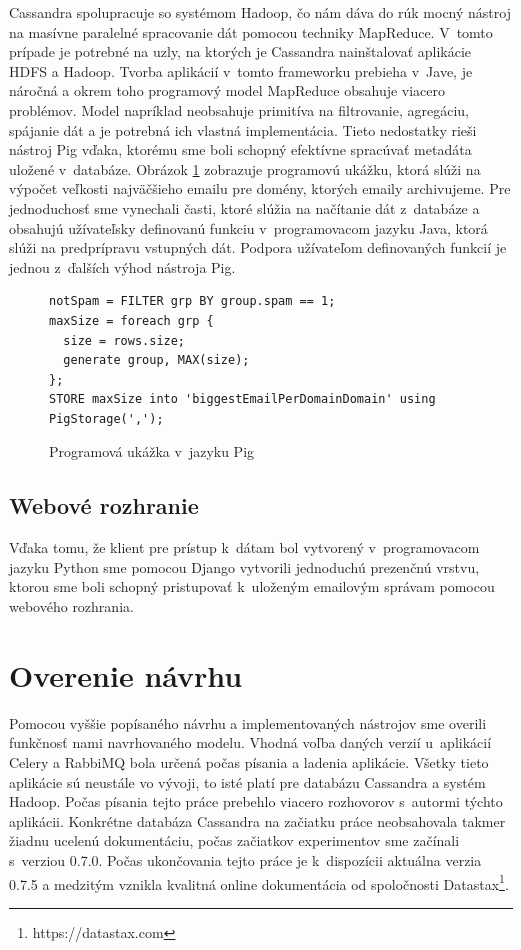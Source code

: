 \documentclass[11pt,twoside,a4paper]{book}
\begin{document}
Cassandra spolupracuje so systémom Hadoop, čo nám dáva do rúk mocný nástroj na masívne paralelné spracovanie dát pomocou techniky MapReduce. V~tomto prípade je potrebné na uzly, na ktorých je Cassandra nainštalovať aplikácie HDFS a Hadoop. Tvorba aplikácií v~tomto frameworku prebieha v~Jave, je náročná a okrem toho programový model MapReduce obsahuje viacero problémov. Model napríklad neobsahuje primitíva na filtrovanie, agregáciu, spájanie dát a je potrebná ich vlastná implementácia. Tieto nedostatky rieši nástroj Pig \cite{olston2008pig} vďaka, ktorému sme boli schopný efektívne spracúvať metadáta uložené v~databáze. Obrázok \ref{fig:PigExample} zobrazuje programovú ukážku, ktorá slúži na výpočet veľkosti najväčšieho emailu pre domény, ktorých emaily archivujeme. Pre jednoduchosť sme vynechali časti, ktoré slúžia na načítanie dát z~databáze a obsahujú užívateľsky definovanú funkciu v~programovacom jazyku Java, ktorá slúži na predprípravu vstupných dát. Podpora užívateľom definovaných funkcií je jednou z~ďalších výhod nástroja Pig.

\begin{figure}[h]
\begin{verbatim}
notSpam = FILTER grp BY group.spam == 1;
maxSize = foreach grp {
  size = rows.size;
  generate group, MAX(size);
};
STORE maxSize into 'biggestEmailPerDomainDomain' using PigStorage(',');
\end{verbatim}
 \caption{Programová ukážka v~jazyku Pig}
 \label{fig:PigExample}
\end{figure}  



\subsection{Webové rozhranie}
Vďaka tomu, že klient pre prístup k~dátam bol vytvorený v~programovacom jazyku Python sme pomocou Django vytvorili jednoduchú prezenčnú vrstvu, ktorou sme boli schopný pristupovať k~uloženým emailovým správam pomocou webového rozhrania.


\section{Overenie návrhu}

Pomocou vyššie popísaného návrhu a implementovaných nástrojov sme overili funkčnosť nami navrhovaného modelu. Vhodná voľba daných verzií u~aplikácií Celery a RabbiMQ bola určená počas písania a ladenia aplikácie. Všetky tieto aplikácie sú neustále vo vývoji, to isté platí pre databázu Cassandra a systém Hadoop. Počas písania tejto práce prebehlo viacero rozhovorov s~autormi týchto aplikácii. Konkrétne databáza Cassandra na začiatku práce neobsahovala takmer žiadnu ucelenú dokumentáciu, počas začiatkov experimentov sme začínali s~verziou 0.7.0. Počas ukončovania tejto práce je k~dispozícii aktuálna verzia 0.7.5 a medzitým vznikla kvalitná online dokumentácia od spoločnosti Datastax\footnote{https://datastax.com}. 
\end{document}
